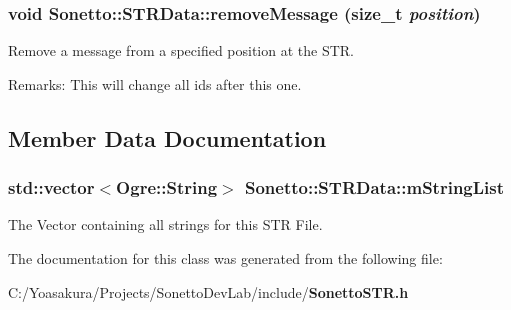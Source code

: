 \subsubsection{\setlength{\rightskip}{0pt plus 5cm}void Sonetto::STRData::removeMessage (size\_\-t {\em position})}\label{class_sonetto_1_1_s_t_r_data_1a51848724e72fd94f8e0817b9c37a4c}


Remove a message from a specified position at the STR. \begin{Desc}
\item[Remarks:]This will change all ids after this one. \end{Desc}


\subsection{Member Data Documentation}
\subsubsection{\setlength{\rightskip}{0pt plus 5cm}std::vector$<$Ogre::String$>$ {\bf Sonetto::STRData::mStringList}\hspace{0.3cm}{\tt  [private]}}\label{class_sonetto_1_1_s_t_r_data_ccb9aa4b3db05bc82fb23026d6ed8110}


The Vector containing all strings for this STR File. 



The documentation for this class was generated from the following file:\begin{CompactItemize}
\item 
C:/Yoasakura/Projects/SonettoDevLab/include/{\bf SonettoSTR.h}\end{CompactItemize}

